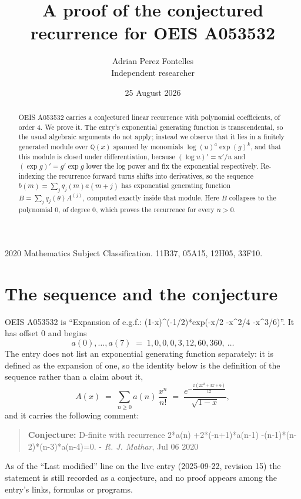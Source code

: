 \documentclass[11pt,a4paper]{article}
\title{A proof of the conjectured recurrence for OEIS A053532}
\author{Adrian Perez Fontelles\\ \small Independent researcher}
\date{25 August 2026}
\theoremstyle{plain}
\theoremstyle{definition}
\begin{document}
\maketitle

\begin{abstract}
OEIS A053532 carries a conjectured linear recurrence with polynomial coefficients, of
order 4. We prove it. The entry's exponential generating function is
transcendental, so the usual algebraic arguments do not apply; instead we observe that it
lies in a finitely generated module over $\mathbb{Q}(x)$ spanned by monomials
$\log(u)^{a}\exp(g)^{k}$, and that this module is closed under differentiation, because
$(\log u)'=u'/u$ and $(\exp g)'=g'\exp g$ lower the log power and fix the exponential
respectively. Re-indexing the recurrence forward turns shifts into derivatives, so the
sequence $b(m)=\sum_{j}q_{j}(m)a(m+j)$ has exponential generating function
$B=\sum_{j}q_{j}(\theta)A^{(j)}$, computed exactly inside that module. Here $B$ collapses
to the polynomial $0$, of degree $0$, which proves the recurrence for every
$n>0$.
\end{abstract}

\noindent\small 2020 Mathematics Subject Classification. 11B37, 05A15, 12H05, 33F10.\normalsize

\section{The sequence and the conjecture}

OEIS A053532 is ``Expansion of e.g.f.: (1-x)\textasciicircum{}(-1/2)*exp(-x/2 -x\textasciicircum{}2/4 -x\textasciicircum{}3/6)''. It has offset $0$ and begins
\[
a(0),\dots,a(7)\;=\;1, 0, 0, 0, 3, 12, 60, 360,\ \dots
\]
The entry does not list an exponential generating function separately: it
is defined as the expansion of one, so the identity below is the definition of the sequence
rather than a claim about it,
\begin{equation}\label{eq:gf}
A(x)\;=\;\sum_{n\ge 0} a(n)\,\frac{x^{n}}{n!}\;=\;\frac{e^{- \frac{x \left(2 x^{2} + 3 x + 6\right)}{12}}}{\sqrt{1 - x}} ,
\end{equation}
and it carries the following comment:
\begin{quote}\small
\textbf{Conjecture:} D-finite with recurrence 2*a(n) +2*(-n+1)*a(n-1) -(n-1)*(n-2)*(n-3)*a(n-4)=0. - \emph{R. J. Mathar}, Jul 06 2020
\end{quote}
As of the ``Last modified'' line on the live entry (2025-09-22, revision 15) the
statement is still recorded as a conjecture, and no proof appears among the entry's links,
formulas or programs.
\end{document}
